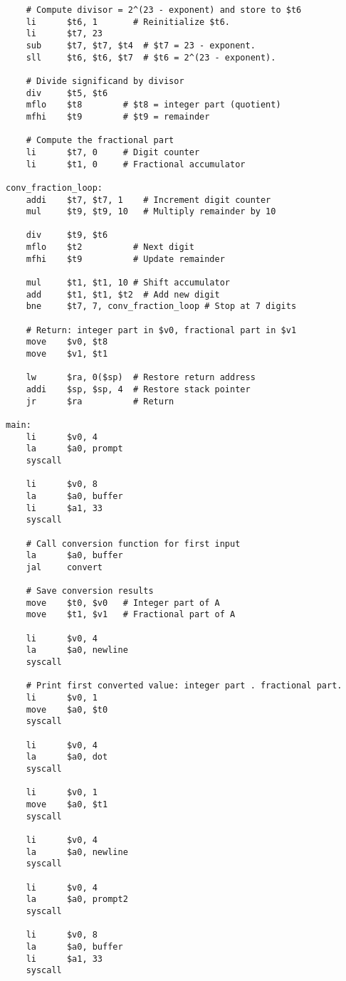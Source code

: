 \documentclass[a4paper]{article}
\begin{document}
\begin{verbatim}
    # Compute divisor = 2^(23 - exponent) and store to $t6
    li      $t6, 1       # Reinitialize $t6.
    li      $t7, 23
    sub     $t7, $t7, $t4  # $t7 = 23 - exponent.
    sll     $t6, $t6, $t7  # $t6 = 2^(23 - exponent).

    # Divide significand by divisor
    div     $t5, $t6
    mflo    $t8        # $t8 = integer part (quotient)
    mfhi    $t9        # $t9 = remainder

    # Compute the fractional part
    li      $t7, 0     # Digit counter
    li      $t1, 0     # Fractional accumulator

conv_fraction_loop:
    addi    $t7, $t7, 1    # Increment digit counter
    mul     $t9, $t9, 10   # Multiply remainder by 10

    div     $t9, $t6
    mflo    $t2          # Next digit
    mfhi    $t9          # Update remainder

    mul     $t1, $t1, 10 # Shift accumulator
    add     $t1, $t1, $t2  # Add new digit
    bne     $t7, 7, conv_fraction_loop # Stop at 7 digits

    # Return: integer part in $v0, fractional part in $v1
    move    $v0, $t8
    move    $v1, $t1

    lw      $ra, 0($sp)  # Restore return address
    addi    $sp, $sp, 4  # Restore stack pointer
    jr      $ra          # Return

main:
    li      $v0, 4
    la      $a0, prompt
    syscall

    li      $v0, 8
    la      $a0, buffer
    li      $a1, 33
    syscall

    # Call conversion function for first input
    la      $a0, buffer
    jal     convert

    # Save conversion results
    move    $t0, $v0   # Integer part of A
    move    $t1, $v1   # Fractional part of A

    li      $v0, 4
    la      $a0, newline
    syscall

    # Print first converted value: integer part . fractional part.
    li      $v0, 1
    move    $a0, $t0
    syscall

    li      $v0, 4
    la      $a0, dot
    syscall

    li      $v0, 1
    move    $a0, $t1
    syscall

    li      $v0, 4
    la      $a0, newline
    syscall

    li      $v0, 4
    la      $a0, prompt2
    syscall

    li      $v0, 8
    la      $a0, buffer
    li      $a1, 33
    syscall


\end{verbatim}
\end{document}
